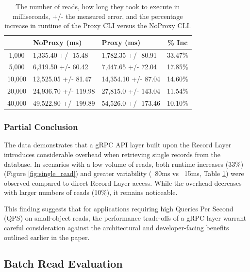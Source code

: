 \documentclass[sigconf]{acmart}
\begin{document}
\begin{table}[h]
\begin{tabular}{|c|l|l|c|}
    \hline
    \rowcolor[HTML]{656565} 
    \multicolumn{1}{|c}{\cellcolor[HTML]{656565}{\color[HTML]{FFFFFF} \textbf{N}}} &
    {\color[HTML]{FFFFFF} \textbf{NoProxy (ms)}} &
    {\color[HTML]{FFFFFF} \textbf{Proxy (ms)}} &
    {\color[HTML]{FFFFFF} \textbf{\% Inc}} \\ \hline
    1,000  & 1,335.40 +/- 15.48   & 1,782.35 +/- 80.91 & 33.47\% \\
    \rowcolor[HTML]{EFEFEF} 
    5,000  & 6,319.50 +/- 60.42   & 7,447.65 +/- 72.04 & 17.85\% \\
    10,000 & 12,525.05 +/- 81.47 & 14,354.10 +/- 87.04 & 14.60\% \\
    \rowcolor[HTML]{EFEFEF} 
    20,000 & 24,936.70 +/- 119.98 & 27,815.0 +/- 143.04  & 11.54\% \\
    40,000 & 49,522.80 +/- 199.89 & 54,526.0 +/- 173.46  & 10.10\% \\ \hline
\end{tabular}
\caption{The number of reads, how long they took to execute in milliseconds, +/- the measured error, and the percentage increase in runtime of the Proxy CLI versus the NoProxy CLI.}
\label{tab:single_read}
\end{table}

\subsubsection{Partial Conclusion}

The data demonstrates that a gRPC API layer built upon the Record Layer introduces considerable overhead when retrieving single records from the database. In scenarios with a low volume of reads, both runtime increases (33\%) (Figure \ref{fig:single_read}) and greater variability (~80ms vs ~15ms, Table \ref{tab:single_read}) were observed compared to direct Record Layer access. While the overhead decreases with larger numbers of reads (10\%), it remains noticeable.

This finding suggests that for applications requiring high Queries Per Second (QPS) on small-object reads, the performance trade-offs of a gRPC layer warrant careful consideration against the architectural and developer-facing benefits outlined earlier in the paper.

\subsection{Batch Read Evaluation}
\end{document}
